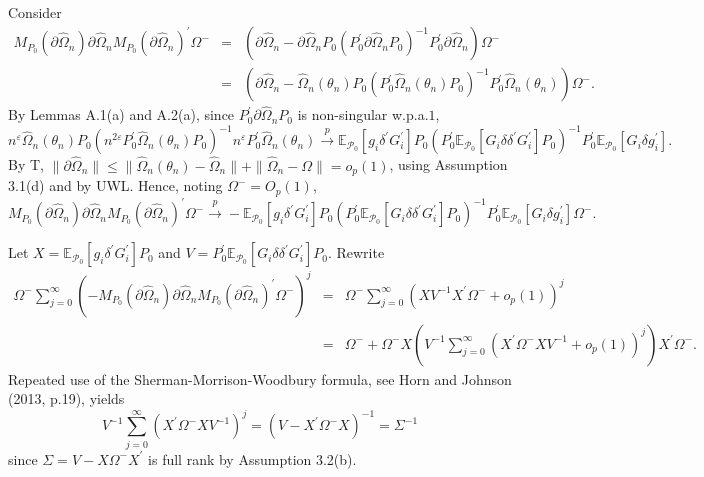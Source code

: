 \documentclass[hidelinks, 11 pt, a4paper, pdflatex]{article}
\begin{document}
{   Consider
    \begin{eqnarray*}
     M_{P_{0}}(\partial \hat{\Omega}_{n}) \partial \hat{\Omega}_{n}M_{P_{0}}(\partial \hat{\Omega}_{n})^{\prime }\Omega ^{-}
      & = & (\partial \hat{\Omega}_{n} - \partial \hat{\Omega}_{n}P_{0}(P_{0}^{\prime} \partial \hat{\Omega}_{n}P_{0})^{-1}P_{0}^{\prime} \partial \hat{\Omega}_{n})\Omega ^{-} \\
      & = & (\partial \hat{\Omega}_{n} - \hat{\Omega}_{n}(\theta_{n})P_{0}(P_{0}^{\prime}\hat{\Omega}_{n}(\theta_{n})P_{0})^{-1}P_{0}^{\prime}\hat{\Omega}_{n}(\theta_{n}))\Omega ^{-}.
    \end{eqnarray*}
   By Lemmas A.1(a) and A.2(a), since $P_{0}^{\prime} \partial \hat{\Omega}_{n}P_{0}$ is non-singular w.p.a.$1$,
    \[
     n^{\varepsilon}\hat{\Omega}_{n}(\theta _{n})P_{0}(n^{2\varepsilon}P_{0}^{\prime}\hat{\Omega}_{n}(\theta _{n})P_{0})^{-1}n^{\varepsilon}P_{0}^{\prime}\hat{\Omega}_{n}(\theta _{n})
      \overset{p}{\rightarrow}
       \mathbb{E}_{\mathcal{P}_{0}}[g_{i}\delta^{\prime}G_{i}^{\prime}]P_{0}(P_{0}^{\prime}\mathbb{E}_{\mathcal{P}_{0}}[G_{i}\delta \delta^{\prime}G_{i}^{\prime}]P_{0})^{-1}P_{0}^{\prime}\mathbb{E}_{\mathcal{P}_{0}}[G_{i}\delta g_{i}^{\prime}].
    \]
   By T, $\|\partial \hat{\Omega}_{n}\| \leq \|\hat{\Omega}_{n}(\theta_{n}) - \hat{\Omega}_{n}\| + \|\hat{\Omega}_{n} - \Omega\| = o_{p}(1)$, using Assumption 3.1(d) and by UWL. Hence, noting $\Omega^{-} = O_{p}(1)$,
    \[
     M_{P_{0}}(\partial \hat{\Omega}_{n}) \partial \hat{\Omega}_{n}M_{P_{0}}(\partial \hat{\Omega}_{n})^{\prime}\Omega ^{-}
      \overset{p} {\rightarrow}
      - \mathbb{E}_{\mathcal{P}_{0}}[g_{i}\delta^{\prime}G_{i}^{\prime}]P_{0}
        (P_{0}^{\prime}\mathbb{E}_{\mathcal{P}_{0}}[G_{i}\delta \delta^{\prime}G_{i}^{\prime}]P_{0})^{-1}
         P_{0}^{\prime}\mathbb{E}_{\mathcal{P}_{0}}[G_{i}\delta g_{i}^{\prime}]\Omega ^{-}.
    \]

   Let $X = \mathbb{E}_{\mathcal{P}_{0}}[g_{i}\delta^{\prime}G_{i}^{\prime}]P_{0}$ and $V = P_{0}^{\prime}\mathbb{E}_{\mathcal{P}_{0}}[G_{i}\delta \delta^{\prime}G_{i}^{\prime}]P_{0}$. Rewrite
    \begin{eqnarray*}
     \Omega^{-} \sum_{j=0}^{\infty} (- M_{P_{0}}(\partial \hat{\Omega}_{n}) \partial \hat{\Omega}_{n}M_{P_{0}}(\partial \hat{\Omega}_{n})^{\prime}\Omega ^{-})^{j}
      & = & \Omega^{-} \sum_{j=0}^{\infty} (XV^{-1}X^{\prime}\Omega^{-} + o_{p}(1))^{j} \\
      & = & \Omega^{-} + \Omega^{-}X(V^{-1} \sum_{j=0}^{\infty} (X^{\prime}\Omega^{-}XV^{-1} + o_{p}(1))^{j})X^{\prime}\Omega ^{-}.
    \end{eqnarray*}
   Repeated use of the Sherman-Morrison-Woodbury formula, see Horn and Johnson (2013, p.19), yields
    \[
     V^{-1} \sum_{j=0}^{\infty} (X^{\prime}\Omega^{-}XV^{-1})^{j} = (V - X^{\prime}\Omega^{-}X)^{-1} = \Sigma^{-1}
    \]
   since $\Sigma = V - X\Omega^{-}X^{\prime}$ is full rank by Assumption 3.2(b).

}
\end{document}
